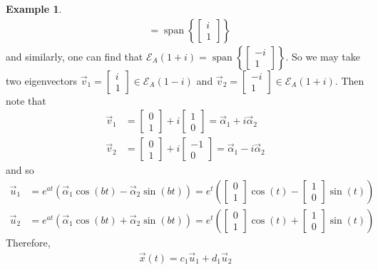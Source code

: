 \documentclass[11pt]{article}
\theoremstyle{definition}\newtheorem{definition}{Definition}
\theoremstyle{definition}\newtheorem{notation}{Notation}
\theoremstyle{definition}\newtheorem{example}{Example}
\theoremstyle{theorem}\newtheorem{theorem}{Theorem}
\theoremstyle{theorem}\newtheorem{corollary}{Corollary}
\theoremstyle{theorem}\newtheorem{proposition}{Proposition}
\theoremstyle{theorem}\newtheorem{lemma}{Lemma}
\theoremstyle{theorem}\newtheorem{question}{Question}
\theoremstyle{remark}\newtheorem{remark}{Remark}
\newcommand{\E}{\mathcal{E}}
\DeclareMathOperator{\Span}{span}
\begin{document}
\begin{example}
\begin{align*}
        &= \Span\left\{\begin{bmatrix} i \\ 1 \end{bmatrix}\right\}
    \end{align*}
    and similarly, one can find that $\E_A(1 + i) = \Span\left\{\begin{bmatrix} -i \\ 1 \end{bmatrix}\right\}$. So we may take two eigenvectors $\vec{v}_1 = \begin{bmatrix} i \\ 1 \end{bmatrix} \in \E_A(1 - i)$ and $\vec{v}_2 = \begin{bmatrix} -i \\ 1 \end{bmatrix} \in \E_A(1 + i)$. Then note that
    \begin{align*}
        \vec{v}_1 &= \begin{bmatrix} 0 \\ 1 \end{bmatrix} + i\begin{bmatrix} 1 \\ 0 \end{bmatrix} = \vec{\alpha}_1 + i\vec{\alpha}_2 \\ 
        \vec{v}_2 &= \begin{bmatrix} 0 \\ 1 \end{bmatrix} + i\begin{bmatrix} -1 \\ 0 \end{bmatrix} = \vec{\alpha}_1 - i\vec{\alpha}_2
    \end{align*}
    and so
    \begin{align*}
        \vec{u}_1 &= e^{at}\left(\vec{\alpha}_1\cos(bt) - \vec{\alpha}_2\sin(bt)\right) = e^t\left(\begin{bmatrix} 0 \\ 1 \end{bmatrix}\cos(t) - \begin{bmatrix} 1 \\ 0 \end{bmatrix}\sin(t)\right) \\
        \vec{u}_2 &= e^{at}\left(\vec{\alpha}_1\cos(bt) + \vec{\alpha}_2\sin(bt)\right) = e^t\left(\begin{bmatrix} 0 \\ 1 \end{bmatrix}\cos(t) + \begin{bmatrix} 1 \\ 0 \end{bmatrix}\sin(t)\right)
    \end{align*}
    Therefore,
    \begin{align*}
        \vec{x}(t) = c_1\vec{u}_1 + d_1\vec{u}_2
    \end{align*}
\end{example}
\end{document}
